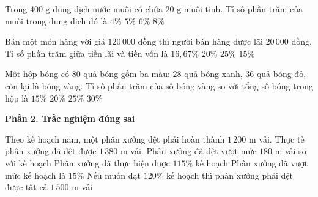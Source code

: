 \begin{ex} %
Trong $400\text{ g}$ dung dịch nước muối có chứa $20\text{ g}$ muối tinh. Tỉ số phần trăm của muối trong dung dịch đó là
\choice
{$4\%$}
{\True $5\%$}
{$6\%$}
{$8\%$}
\end{ex}

\begin{ex} %
Bán một món hàng với giá $120\,000$ đồng thì người bán hàng được lãi $20\,000$ đồng. Tỉ số phần trăm giữa tiền lãi và tiền vốn là
\choice
{$16{,}67\%$}
{\True $20\%$}
{$25\%$}
{$15\%$}
\end{ex}

\begin{ex} %
Một hộp bóng có $80$ quả bóng gồm ba màu: $28$ quả bóng xanh, $36$ quả bóng đỏ, còn lại là bóng vàng. Tỉ số phần trăm của số bóng vàng so với tổng số bóng trong hộp là
\choice
{$15\%$}
{\True $20\%$}
{$25\%$}
{$30\%$}
\end{ex}

\textbf{Phần 2. Trắc nghiệm đúng sai}

\begin{ex} %
Theo kế hoạch năm, một phân xưởng dệt phải hoàn thành $1\,200\text{ m}$ vải. Thực tế phân xưởng đã dệt được $1\,380\text{ m}$ vải.
\choiceTF
{\True Phân xưởng đã dệt vượt mức $180\text{ m}$ vải so với kế hoạch}
{\True Phân xưởng đã thực hiện được $115\%$ kế hoạch}
{\True Phân xưởng đã vượt mức kế hoạch là $15\%$}
{Nếu muốn đạt $120\%$ kế hoạch thì phân xưởng phải dệt được tất cả $1\,500\text{ m}$ vải}
\end{ex}

